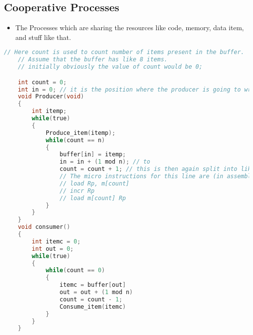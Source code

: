 \documentclass[11pt]{article}
\begin{document}
\subsection{Cooperative Processes}
\begin{itemize}
	\item The Processes which are sharing the resources like code, memory, data item, and stuff like that. 
\end{itemize}

\begin{lstlisting}[language=C]
	// Here count is used to count number of items present in the buffer. 
	// Assume that the buffer has like 8 items. 
	// initially obviously the value of count would be 0;

	int count = 0;
	int in = 0; // it is the position where the producer is going to write the newly generated data item. 
	void Producer(void)
	{
		int itemp;
		while(true)
		{
			Produce_item(itemp);
			while(count == n)
			{
				buffer[in] = itemp;
				in = in + (1 mod n); // to 
				count = count + 1; // this is then again split into like 3 other commands in assembly. 
				// The micro instructions for this line are (in assembly)
				// load Rp, m[count]
				// incr Rp
				// load m[count] Rp
			}
		}
	}
	void consumer()
	{
		int itemc = 0;
		int out = 0;
		while(true)
		{
			while(count == 0)
			{
				itemc = buffer[out]
				out = out + (1 mod n)
				count = count - 1;
				Consume_item(itemc)
			}
		}
	}
\end{lstlisting}
\end{document}
